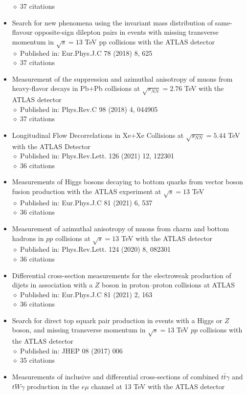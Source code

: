 \documentclass[margin, 10pt]{res} %
\begin{document}
\begin{resume}
\begin{itemize}
$\diamond$ 37 citations
\item Search for new phenomena using the invariant mass distribution of same-flavour opposite-sign dilepton pairs in events with missing transverse momentum in $\sqrt{s} = 13$ TeV pp collisions with the ATLAS detector\\
$\diamond$ Published in: Eur.Phys.J.C 78 (2018) 8, 625\\
$\diamond$ 37 citations
\item Measurement of the suppression and azimuthal anisotropy of muons from heavy-flavor decays in Pb+Pb collisions at $\sqrt{s_{NN}} = 2.76$ TeV with the ATLAS detector\\
$\diamond$ Published in: Phys.Rev.C 98 (2018) 4, 044905\\
$\diamond$ 37 citations
\item Longitudinal Flow Decorrelations in Xe+Xe Collisions at $\sqrt{s_{NN}} = 5.44$ TeV with the ATLAS Detector\\
$\diamond$ Published in: Phys.Rev.Lett. 126 (2021) 12, 122301\\
$\diamond$ 36 citations
\item Measurements of Higgs bosons decaying to bottom quarks from vector boson fusion production with the ATLAS experiment at $\sqrt{s} = 13$ TeV\\
$\diamond$ Published in: Eur.Phys.J.C 81 (2021) 6, 537\\
$\diamond$ 36 citations
\item Measurement of azimuthal anisotropy of muons from charm and bottom hadrons in $pp$ collisions at $\sqrt{s} = 13$ TeV with the ATLAS detector\\
$\diamond$ Published in: Phys.Rev.Lett. 124 (2020) 8, 082301\\
$\diamond$ 36 citations
\item Differential cross-section measurements for the electroweak production of dijets in association with a $Z$ boson in proton–proton collisions at ATLAS\\
$\diamond$ Published in: Eur.Phys.J.C 81 (2021) 2, 163\\
$\diamond$ 36 citations
\item Search for direct top squark pair production in events with a Higgs or $Z$ boson, and missing transverse momentum in $\sqrt{s} = 13$ TeV $pp$ collisions with the ATLAS detector\\
$\diamond$ Published in: JHEP 08 (2017) 006\\
$\diamond$ 35 citations
\item Measurements of inclusive and differential cross-sections of combined $t\bar{t}\gamma$ and $tW\gamma$ production in the $e\mu$ channel at 13 TeV with the ATLAS detector\\

\end{itemize}
\end{resume}
\end{document}

